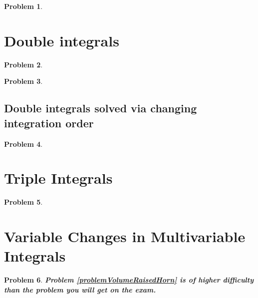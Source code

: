 \documentclass{article}
\newtheorem{problem}{Problem}
\begin{document}
\begin{problem}

\end{problem}


\section{Double integrals}

\begin{problem}

\end{problem}

\begin{problem}

\end{problem}

\subsection{Double integrals solved via changing integration order}

\begin{problem}

\end{problem}

\section{Triple Integrals}
\begin{problem}

\end{problem}


\section{Variable Changes in Multivariable Integrals}
\begin{problem}
\textbf{Problem \ref{problemVolumeRaisedHorn} is of higher difficulty than the problem you will get on the exam.}


\end{problem}

\end{document}
